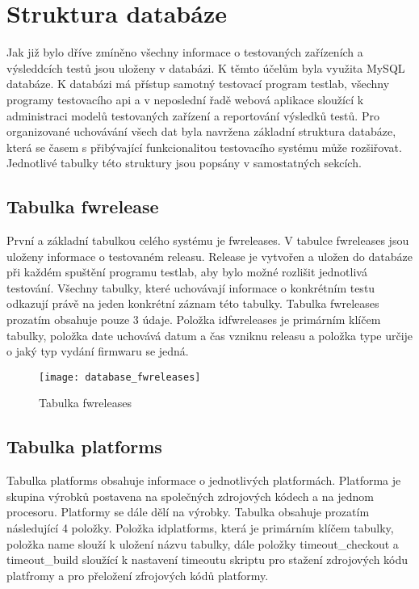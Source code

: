 \section{Struktura databáze}
Jak již bylo dříve zmíněno všechny informace o testovaných zařízeních a výsleddcích testů jsou uloženy v databázi. K těmto účelům byla využita MySQL databáze. K databázi má přístup samotný testovací program testlab, všechny programy testovacího api a v neposlední řadě webová aplikace sloužící k administraci modelů testovaných zařízení a reportování výsledků testů. Pro organizované uchovávání všech dat byla navržena základní struktura databáze, která se časem s přibývající funkcionalitou testovacího systému může rozšiřovat. Jednotlivé tabulky této struktury jsou popsány v samostatných sekcích.

\subsection{Tabulka fwrelease}
První a základní tabulkou celého systému je fwreleases. V tabulce fwreleases jsou uloženy informace o testovaném releasu. Release je vytvořen a uložen do databáze při každém spuštění programu testlab, aby bylo možné rozlišit jednotlivá testování. Všechny tabulky, které uchovávají informace o konkrétním testu odkazují právě na jeden konkrétní záznam této tabulky. Tabulka fwreleases prozatím obsahuje pouze 3 údaje. Položka idfwreleases je primárním klíčem tabulky, položka date uchovává datum a čas vzniknu releasu a položka type určije o jaký typ vydání firmwaru se jedná.

\begin{figure}[h]
  \centering
  \texttt{[image: database\_fwreleases]}
  \caption{Tabulka fwreleases}
  \label{fig:database_fwreleases}
\end{figure}

\subsection{Tabulka platforms}
Tabulka platforms obsahuje informace o jednotlivých platformách. Platforma je skupina výrobků postavena na společných zdrojových kódech a na jednom procesoru. Platformy se dále dělí na výrobky. Tabulka obsahuje prozatím následující 4 položky. Položka idplatforms, která je primárním klíčem tabulky, položka name slouží k uložení názvu tabulky, dále položky timeout\_checkout a timeout\_build sloužící k nastavení timeoutu skriptu pro stažení zdrojových kódu platfromy a pro přeložení zfrojových kódů platformy.

